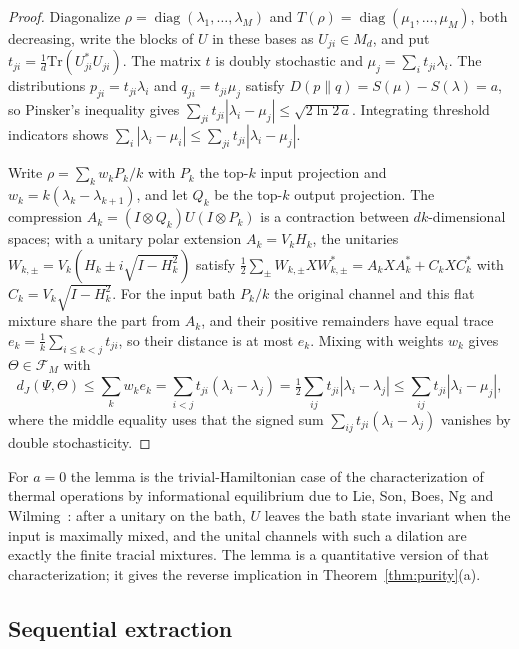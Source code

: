 \documentclass[11pt,a4paper]{article}
\theoremstyle{plain}
\theoremstyle{definition}
\theoremstyle{remark}
\DeclareMathOperator{\diag}{diag}
\newcommand{\dJ}{d_J}
\begin{document}
\begin{proof}
Diagonalize $\rho=\diag(\lambda_1,\dots,\lambda_M)$ and $T(\rho)=\diag(\mu_1,\dots,\mu_M)$, both decreasing, write the blocks of $U$ in these
bases as $U_{ji}\in M_d$, and put $t_{ji}=\frac1d\mathrm{Tr}(U_{ji}^*U_{ji})$. The matrix $t$ is doubly stochastic and
$\mu_j=\sum_it_{ji}\lambda_i$. The distributions $p_{ji}=t_{ji}\lambda_i$ and $q_{ji}=t_{ji}\mu_j$ satisfy $D(p\|q)=S(\mu)-S(\lambda)=a$, so
Pinsker's inequality gives $\sum_{ji}t_{ji}|\lambda_i-\mu_j|\le\sqrt{2\ln2\,a}$. Integrating threshold indicators shows
$\sum_i|\lambda_i-\mu_i|\le\sum_{ji}t_{ji}|\lambda_i-\mu_j|$.

Write $\rho=\sum_kw_kP_k/k$ with $P_k$ the top-$k$ input projection and $w_k=k(\lambda_k-\lambda_{k+1})$, and let $Q_k$ be the top-$k$
output projection. The compression $A_k=(I\otimes Q_k)U(I\otimes P_k)$ is a contraction between $dk$-dimensional spaces;
with a unitary polar extension $A_k=V_kH_k$, the unitaries $W_{k,\pm}=V_k(H_k\pm i\sqrt{I-H_k^2})$ satisfy
$\frac12\sum_\pm W_{k,\pm}XW_{k,\pm}^*=A_kXA_k^*+C_kXC_k^*$ with $C_k=V_k\sqrt{I-H_k^2}$. For the input bath $P_k/k$ the
original channel and this flat mixture share the part from $A_k$, and their positive remainders have equal trace
$e_k=\frac1k\sum_{i\le k<j}t_{ji}$, so their distance is at most $e_k$. Mixing with weights $w_k$ gives $\Theta\in\mathcal F_M$
with
\[
\dJ(\Psi,\Theta)\le\sum_kw_ke_k=\sum_{i<j}t_{ji}(\lambda_i-\lambda_j)=\tfrac12\sum_{ij}t_{ji}|\lambda_i-\lambda_j|\le\sum_{ij}t_{ji}|\lambda_i-\mu_j|,
\]
where the middle equality uses that the signed sum $\sum_{ij}t_{ji}(\lambda_i-\lambda_j)$ vanishes by double stochasticity.
\end{proof}

For $a=0$ the lemma is the trivial-Hamiltonian case of the characterization of thermal operations by informational equilibrium due to Lie,
Son, Boes, Ng and Wilming~\cite[Proposition~4 and Eq.~(14)]{LSBNW2026}: after a unitary on the bath, $U$ leaves the bath state invariant
when the input is maximally mixed, and the unital channels with such a dilation are exactly the finite tracial mixtures. The lemma is a
quantitative version of that characterization; it gives the reverse implication in Theorem~\ref{thm:purity}(a).

\subsection{Sequential extraction}
\end{document}
